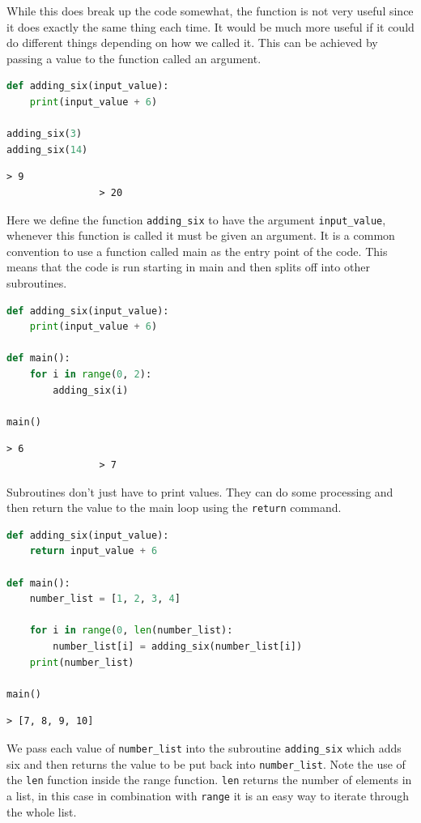While this does break up the code somewhat, the function is not very useful since it does exactly the same thing each time. It would be much more useful if it could do different things depending on how we called it. This can be achieved by passing a value to the function called an argument.

			\begin{lstlisting}[language=Python]
def adding_six(input_value):
	print(input_value + 6)

adding_six(3)
adding_six(14)\end{lstlisting}
			\begin{verbatim}> 9
				> 20\end{verbatim}

				Here we define the function \texttt{adding\_six} to have the argument \texttt{input\_value}, whenever this function is called it must be given an argument. It is a common convention to use a function called main as the entry point of the code. This means that the code is run starting in main and then splits off into other subroutines.
				
			\begin{lstlisting}[language=Python]
def adding_six(input_value):
	print(input_value + 6)

def main():
	for i in range(0, 2):
		adding_six(i)
		
main()\end{lstlisting}
			\begin{verbatim}> 6
				> 7\end{verbatim}
				
				Subroutines don't just have to print values. They can do some processing and then return the value to the main loop using the \texttt{return} command.

			\begin{lstlisting}[language=Python]
def adding_six(input_value):
	return input_value + 6

def main():
	number_list = [1, 2, 3, 4]
	
	for i in range(0, len(number_list):
		number_list[i] = adding_six(number_list[i])
	print(number_list)
			
main()\end{lstlisting}

			\begin{verbatim}> [7, 8, 9, 10]\end{verbatim}
			
			We pass each value of \texttt{number\_list} into the subroutine \texttt{adding\_six} which adds six and then returns the value to be put back into \texttt{number\_list}. Note the use of the \texttt{len} function inside the range function. \texttt{len} returns the number of elements in a list, in this case in combination with \texttt{range} it is an easy way to iterate through the whole list.
				
